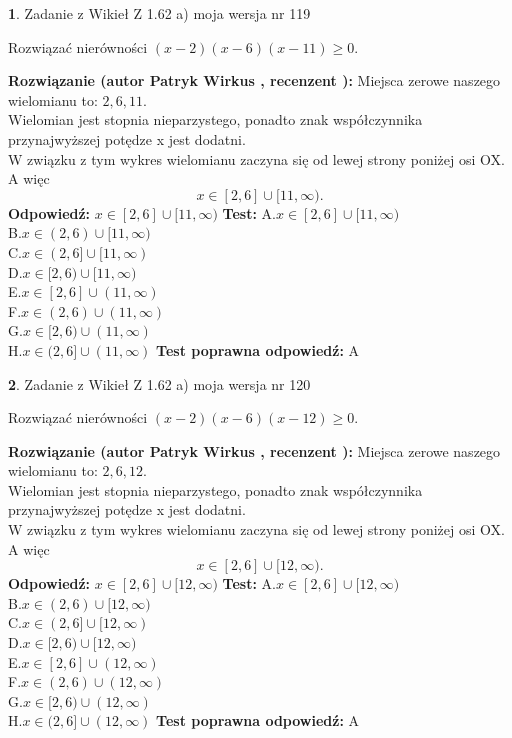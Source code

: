 \documentclass[12pt, a4paper]{article}
\theoremstyle{definition} %
\newtheorem{zad}{}
\newcommand{\zadStart}[1]{\begin{zad}#1\newline}
\newcommand{\zadStop}{\end{zad}}
\newcommand{\rozwStart}[2]{\noindent \textbf{Rozwiązanie (autor #1 , recenzent #2): }\newline}
\newcommand{\rozwStop}{\newline}
\newcommand{\odpStart}{\noindent \textbf{Odpowiedź:}\newline}
\newcommand{\odpStop}{\newline}
\newcommand{\testStart}{\noindent \textbf{Test:}\newline}
\newcommand{\testStop}{\newline}
\newcommand{\kluczStart}{\noindent \textbf{Test poprawna odpowiedź:}\newline}
\newcommand{\kluczStop}{\newline}
\begin{document}
\zadStart{Zadanie z Wikieł Z 1.62 a) moja wersja nr 119}

Rozwiązać nierówności $(x-2)(x-6)(x-11)\ge0$.
\zadStop
\rozwStart{Patryk Wirkus}{}
Miejsca zerowe naszego wielomianu to: $2, 6, 11$.\\
Wielomian jest stopnia nieparzystego, ponadto znak współczynnika przy\linebreak najwyższej potędze x jest dodatni.\\ W związku z tym wykres wielomianu zaczyna się od lewej strony poniżej osi OX. A więc $$x \in [2,6] \cup [11,\infty).$$
\rozwStop
\odpStart
$x \in [2,6] \cup [11,\infty)$
\odpStop
\testStart
A.$x \in [2,6] \cup [11,\infty)$\\
B.$x \in (2,6) \cup [11,\infty)$\\
C.$x \in (2,6] \cup [11,\infty)$\\
D.$x \in [2,6) \cup [11,\infty)$\\
E.$x \in [2,6] \cup (11,\infty)$\\
F.$x \in (2,6) \cup (11,\infty)$\\
G.$x \in [2,6) \cup (11,\infty)$\\
H.$x \in (2,6] \cup (11,\infty)$
\testStop
\kluczStart
A
\kluczStop



\zadStart{Zadanie z Wikieł Z 1.62 a) moja wersja nr 120}

Rozwiązać nierówności $(x-2)(x-6)(x-12)\ge0$.
\zadStop
\rozwStart{Patryk Wirkus}{}
Miejsca zerowe naszego wielomianu to: $2, 6, 12$.\\
Wielomian jest stopnia nieparzystego, ponadto znak współczynnika przy\linebreak najwyższej potędze x jest dodatni.\\ W związku z tym wykres wielomianu zaczyna się od lewej strony poniżej osi OX. A więc $$x \in [2,6] \cup [12,\infty).$$
\rozwStop
\odpStart
$x \in [2,6] \cup [12,\infty)$
\odpStop
\testStart
A.$x \in [2,6] \cup [12,\infty)$\\
B.$x \in (2,6) \cup [12,\infty)$\\
C.$x \in (2,6] \cup [12,\infty)$\\
D.$x \in [2,6) \cup [12,\infty)$\\
E.$x \in [2,6] \cup (12,\infty)$\\
F.$x \in (2,6) \cup (12,\infty)$\\
G.$x \in [2,6) \cup (12,\infty)$\\
H.$x \in (2,6] \cup (12,\infty)$
\testStop
\kluczStart
A
\kluczStop
\end{document}
